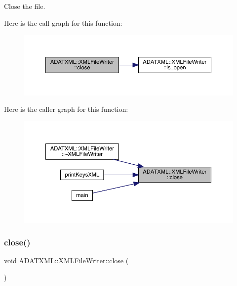 Close the file. 

Here is the call graph for this function\+:
\nopagebreak
\begin{figure}[H]
\begin{center}
\leavevmode
\includegraphics[width=350pt]{d6/ddb/classADATXML_1_1XMLFileWriter_a1a51ceb51781ac6f3a476dcf99a75017_cgraph}
\end{center}
\end{figure}
Here is the caller graph for this function\+:
\nopagebreak
\begin{figure}[H]
\begin{center}
\leavevmode
\includegraphics[width=350pt]{d6/ddb/classADATXML_1_1XMLFileWriter_a1a51ceb51781ac6f3a476dcf99a75017_icgraph}
\end{center}
\end{figure}
\mbox{\label{classADATXML_1_1XMLFileWriter_a1a51ceb51781ac6f3a476dcf99a75017}} 
\subsubsection{\texorpdfstring{close()}{close()}\hspace{0.1cm}{\footnotesize\ttfamily [2/3]}}
{\footnotesize\ttfamily void A\+D\+A\+T\+X\+M\+L\+::\+X\+M\+L\+File\+Writer\+::close (\begin{DoxyParamCaption}{ }\end{DoxyParamCaption})}



